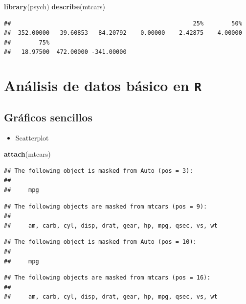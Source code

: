 \documentclass[]{book}
\newenvironment{Shaded}{\begin{snugshade}}{\end{snugshade}}
\newcommand{\KeywordTok}[1]{\textcolor[rgb]{0.13,0.29,0.53}{\textbf{#1}}}
\newcommand{\NormalTok}[1]{#1}
\providecommand{\tightlist}{%
  \setlength{\itemsep}{0pt}\setlength{\parskip}{0pt}}
\begin{document}
\begin{Shaded}
\begin{Highlighting}[]
\KeywordTok{library}\NormalTok{(psych)}
\KeywordTok{describe}\NormalTok{(mtcars)}
\end{Highlighting}
\end{Shaded}

\begin{verbatim}
##                                                    25%        50% 
##  352.00000   39.60853   84.20792    0.00000    2.42875    4.00000 
##        75%                       
##   18.97500  472.00000 -341.00000
\end{verbatim}

\chapter{\texorpdfstring{Análisis de datos básico en
\texttt{R}}{Análisis de datos básico en R}}\label{basic}

\section{Gráficos sencillos}\label{graficos-sencillos}

\begin{itemize}
\tightlist
\item
  Scatterplot
\end{itemize}

\begin{Shaded}
\begin{Highlighting}[]
\KeywordTok{attach}\NormalTok{(mtcars)}
\end{Highlighting}
\end{Shaded}

\begin{verbatim}
## The following object is masked from Auto (pos = 3):
## 
##     mpg
\end{verbatim}

\begin{verbatim}
## The following objects are masked from mtcars (pos = 9):
## 
##     am, carb, cyl, disp, drat, gear, hp, mpg, qsec, vs, wt
\end{verbatim}

\begin{verbatim}
## The following object is masked from Auto (pos = 10):
## 
##     mpg
\end{verbatim}

\begin{verbatim}
## The following objects are masked from mtcars (pos = 16):
## 
##     am, carb, cyl, disp, drat, gear, hp, mpg, qsec, vs, wt
\end{verbatim}
\end{document}
